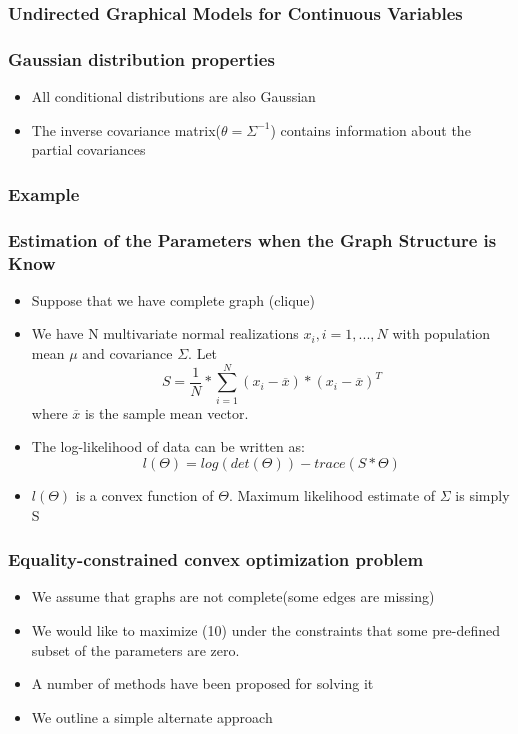 \documentclass{beamer}
\begin{document}
\begin{frame}
\frametitle{Undirected Graphical Models for Continuous Variables}
\end{frame}
\begin{frame}
\frametitle{Gaussian distribution properties}
\begin{itemize}
\item All conditional distributions are also Gaussian
\item The inverse covariance matrix($\theta = \Sigma^{-1}$)
contains information about the partial covariances
\end{itemize}
\end{frame}
\begin{frame}
\frametitle{Example}
\end{frame}
\begin{frame}
\frametitle{Estimation of the Parameters when the Graph Structure is Know}
\begin{itemize}
\item Suppose that we have complete graph (clique)
\item We have N multivariate normal realizations $x_i , i = 1,... ,N$ with population mean $\mu$ and covariance $\Sigma$. Let
\begin{equation}
S=\frac{1}{N}*\sum_{i=1}^{N} (x_i-\overline{x})*(x_i-\overline{x})^T
\end{equation}
where $\overline{x}$ is the sample mean vector.
\item The log-likelihood of data can be written as: 
\begin{equation}
l(\Theta)=log(det(\Theta))-trace(S*\Theta)
\end{equation}
\item $l(\Theta)$ is a convex function of $\Theta$.  Maximum likelihood estimate of $\Sigma$ is simply S 
\end{itemize}
\end{frame}

\begin{frame}
\frametitle{Equality-constrained convex optimization problem}
\begin{itemize}
\item We assume that graphs are not complete(some edges are missing)
\item We would like to maximize
(10) under the constraints that some pre-defined subset of the parameters are zero.
\item A number of methods have been proposed for solving it
\item We outline a simple alternate approach 
\end{itemize}
\end{frame}
\end{document}
